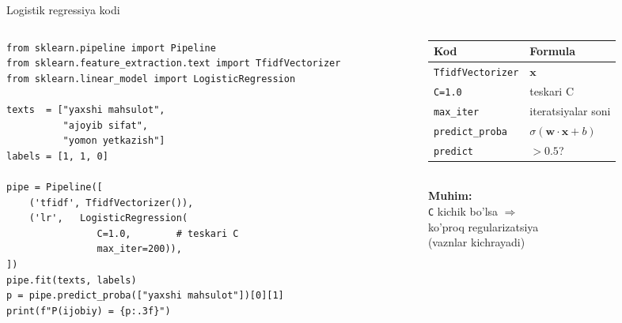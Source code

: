 \documentclass[aspectratio=169,11pt]{beamer}
\begin{document}
\begin{frame}[fragile]{Logistik regressiya kodi}
  \begin{columns}[T]
    \begin{column}{0.58\textwidth}
\begin{lstlisting}
from sklearn.pipeline import Pipeline
from sklearn.feature_extraction.text import TfidfVectorizer
from sklearn.linear_model import LogisticRegression

texts  = ["yaxshi mahsulot",
          "ajoyib sifat",
          "yomon yetkazish"]
labels = [1, 1, 0]

pipe = Pipeline([
    ('tfidf', TfidfVectorizer()),
    ('lr',   LogisticRegression(
                C=1.0,        # teskari C
                max_iter=200)),
])
pipe.fit(texts, labels)
p = pipe.predict_proba(["yaxshi mahsulot"])[0][1]
print(f"P(ijobiy) = {p:.3f}")
\end{lstlisting}
    \end{column}
    \begin{column}{0.39\textwidth}
      \small
      \begin{tabular}{@{}ll@{}}
        \toprule
        Kod & Formula \\
        \midrule
        \texttt{TfidfVectorizer} & $\mathbf{x}$ \\
        \texttt{C=1.0}           & teskari C\\
        \texttt{max\_iter}       & iteratsiyalar soni\\
        \texttt{predict\_proba}  & $\sigma(\mathbf{w}\cdot\mathbf{x}+b)$ \\
        \texttt{predict}         & $>0.5$? \\
        \bottomrule
      \end{tabular}
      \vspace{6pt}\\
      \small\textbf{Muhim:}\\
      \texttt{C} kichik bo'lsa $\Rightarrow$\\
      ko'proq regularizatsiya\\
      (vaznlar kichrayadi)
    \end{column}
  \end{columns}
\end{frame}
\end{document}
